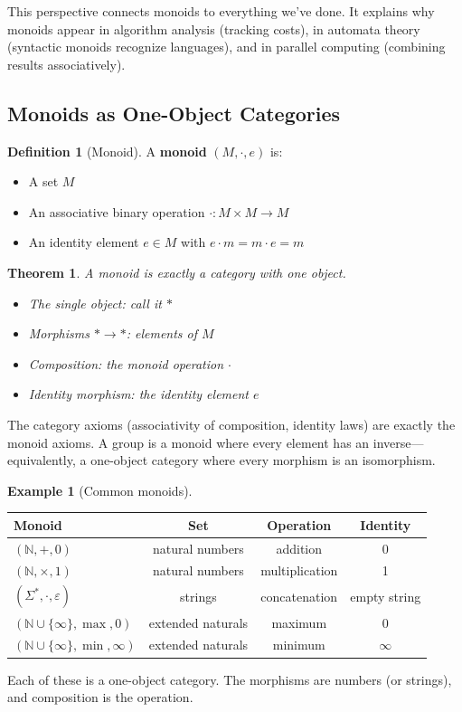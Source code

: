 \documentclass[11pt]{article}
\newcommand{\N}{\mathbb{N}}
\theoremstyle{definition}
\newtheorem{definition}{Definition}[section]
\newtheorem{example}{Example}[section]
\theoremstyle{plain}
\newtheorem{theorem}{Theorem}[section]
\theoremstyle{remark}
\begin{document}
This perspective connects monoids to everything we've done. It explains why monoids appear in algorithm analysis (tracking costs), in automata theory (syntactic monoids recognize languages), and in parallel computing (combining results associatively).

\subsection{Monoids as One-Object Categories}

\begin{definition}[Monoid]
A \textbf{monoid} $(M, \cdot, e)$ is:
\begin{itemize}
  \item A set $M$
  \item An associative binary operation $\cdot: M \times M \to M$
  \item An identity element $e \in M$ with $e \cdot m = m \cdot e = m$
\end{itemize}
\end{definition}

\begin{theorem}
A monoid is exactly a category with one object.
\begin{itemize}
  \item The single object: call it $*$
  \item Morphisms $* \to *$: elements of $M$
  \item Composition: the monoid operation $\cdot$
  \item Identity morphism: the identity element $e$
\end{itemize}
\end{theorem}

The category axioms (associativity of composition, identity laws) are exactly the monoid axioms. A group is a monoid where every element has an inverse---equivalently, a one-object category where every morphism is an isomorphism.

\begin{example}[Common monoids]
\begin{center}
\begin{tabular}{lccc}
\textbf{Monoid} & \textbf{Set} & \textbf{Operation} & \textbf{Identity} \\
\hline
$(\N, +, 0)$ & natural numbers & addition & 0 \\
$(\N, \times, 1)$ & natural numbers & multiplication & 1 \\
$(\Sigma^*, \cdot, \varepsilon)$ & strings & concatenation & empty string \\
$(\N \cup \{\infty\}, \max, 0)$ & extended naturals & maximum & 0 \\
$(\N \cup \{\infty\}, \min, \infty)$ & extended naturals & minimum & $\infty$ \\
\end{tabular}
\end{center}
Each of these is a one-object category. The morphisms are numbers (or strings), and composition is the operation.
\end{example}
\end{document}
